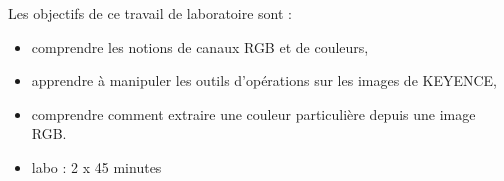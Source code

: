 \noindent Les objectifs de ce travail de laboratoire sont :
\begin{itemize}
  \item comprendre les notions de canaux RGB et de couleurs,
  \item apprendre à manipuler les outils d'opérations sur les images de KEYENCE,
  \item comprendre comment extraire une couleur particulière depuis une image RGB.
\end{itemize}
\vspace{0.5cm}

\begin{itemize}
\item labo : 2 x 45 minutes\\
\end{itemize}
